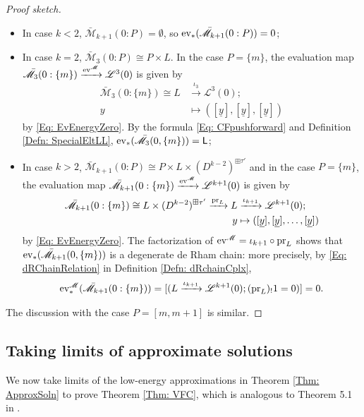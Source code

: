 \documentclass[10pt]{amsart}
\numberwithin{equation}{section}
\theoremstyle{plain}
\theoremstyle{definition}
\theoremstyle{remark}
\numberwithin{equation}{section}
\newcommand{\ev}{\textup{ev}}
\newcommand{\ms}[1]{\mathscr{#1}}
\newcommand{\pr}{\textup{pr}}
\newcommand{\LL}{\textsf{L}}
\begin{document}
{\begin{proof}[Proof sketch]
	\begin{itemize}
		\item In case $k<2$, $\bar{\ms{M}}_{k+1}(0:P)=\emptyset$, so $\ev_*(\bar{\ms{M}}_{k+1}(0:P))=0$;
		\item In case $k=2$, $\bar{\ms{M}}_{3}(0:P)\cong P\times L$. In the case $P=\{m\}$, the evaluation map $\bar{\ms{M}}_3(0:\{m\})\xrightarrow{\ev^\ms{M}} \ms{L}^3(0)$ is given by \begin{align*}	
				\bar{\ms{M}}_3(0:\{m\})\cong L&\xrightarrow{\iota_3} \ms{L}^3(0); \\ y &\mapsto ([\underline{y}],[\underline{y}],[\underline{y}])
			\end{align*}
			 by \eqref{Eq: EvEnergyZero}. 
		By the formula \eqref{Eq: CFpushforward} and Definition \ref{Defn: SpecialEltLL}, $\ev_*(\bar{\ms{M}}_{3}(0,\{m\}))= \LL$;
		\item In case $k>2$, $\bar{\ms{M}}_{k+1}(0:P)\cong P\times L \times (D^{k-2})^{\boxplus\tau'}$ and in the case $P=\{m\}$, the evaluation map $\bar{\ms{M}}_{k+1}(0:\{m\})\xrightarrow{\ev^\ms{M}} \ms{L}^{k+1}(0)$  is given by \begin{align*}
			 \bar{\ms{M}}_{k+1}(0:\{m\}) \cong L\times (D^{k-2})^{\boxplus \tau'} \xrightarrow{\pr_L} L &\xrightarrow{\iota_{k+1}} \ms{L}^{k+1}(0);\\
			 y &\mapsto ([\underline{y}],[\underline{y}],\dots,[\underline{y}])  		
			 \end{align*} 
			 by \eqref{Eq: EvEnergyZero}. The factorization of $\ev^\ms{M}=\iota_{k+1}\circ \pr_L$ shows that $\ev_*(\bar{\ms{M}}_{k+1}(0,\{m\}))$ is a degenerate de Rham chain: more precisely,  by \eqref{Eq: dRChainRelation} in Definition \ref{Defn: dRchainCplx},
			 \begin{align*}
			 	\ev^\ms{M}_*(\bar{\ms{M}}_{k+1}(0:\{m\})) = [(L\xrightarrow{\iota_{k+1}} \ms{L}^{k+1}(0); (\pr_L)_! 1=0)]=0.
			 \end{align*}
	\end{itemize}
	The discussion with the case $P=[m,m+1]$ is similar.
\end{proof}



\subsection{Taking limits of approximate solutions}
\label{Subsc: VFC}
We now take limits of the low-energy approximations in Theorem \ref{Thm: ApproxSoln} to prove Theorem \ref{Thm: VFC}, which is analogous to Theorem 5.1 in \cite{Irie2}.


}
\end{document}
